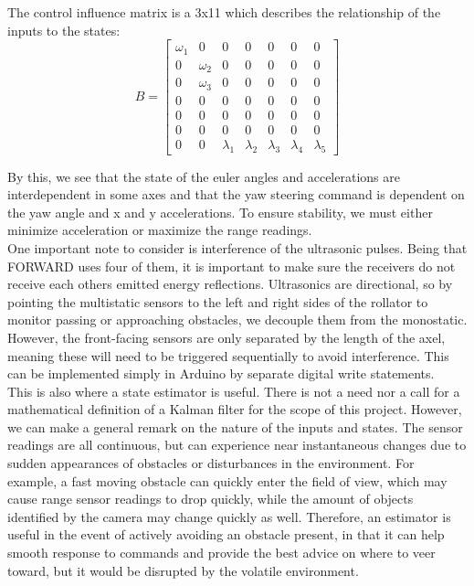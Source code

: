 The control influence matrix is a 3x11 which describes the relationship of the inputs to the states:\\
\[B = \begin{bmatrix}
	\omega_1 & 0 & 0 & 0 & 0 & 0 & 0 \\
	0 & \omega_2 & 0 & 0 & 0 & 0 & 0 \\
	0 & \omega_3 & 0 & 0 & 0 & 0 & 0 \\
	0 & 0 & 0 & 0 & 0 & 0 & 0 \\
	0 & 0 & 0 & 0 & 0 & 0 & 0 \\
	0 & 0 & 0 & 0 & 0 & 0 & 0 \\
	0 & 0 & \lambda_1 & \lambda_2 & \lambda_3 & \lambda_4 & \lambda_5
\end{bmatrix}\]

\noindent By this, we see that the state of the euler angles and accelerations are interdependent in some axes and that the yaw steering command is dependent on the yaw angle and x and y accelerations. To ensure stability, we must either minimize acceleration or maximize the range readings.\\

\noindent One important note to consider is interference of the ultrasonic pulses. Being that FORWARD uses four of them, it is important to make sure the receivers do not receive each others emitted energy reflections. Ultrasonics are directional, so by pointing the multistatic sensors to the left and right sides of the rollator to monitor passing or approaching obstacles, we decouple them from the monostatic. However, the front-facing sensors are only separated by the length of the axel, meaning these will need to be triggered sequentially to avoid interference. This can be implemented simply in Arduino by separate digital write statements.\\

\noindent This is also where a state estimator is useful. There is not a need nor a call for a mathematical definition of a Kalman filter for the scope of this project. However, we can make a general remark on the nature of the inputs and states. The sensor readings are all continuous, but can experience near instantaneous changes due to sudden appearances of obstacles or disturbances in the environment. For example, a fast moving obstacle can quickly enter the field of view, which may cause range sensor readings to drop quickly, while the amount of objects identified by the camera may change quickly as well. Therefore, an estimator is useful in the event of actively avoiding an obstacle present, in that it can help smooth response to commands and provide the best advice on where to veer toward, but it would be disrupted by the volatile environment.\\

